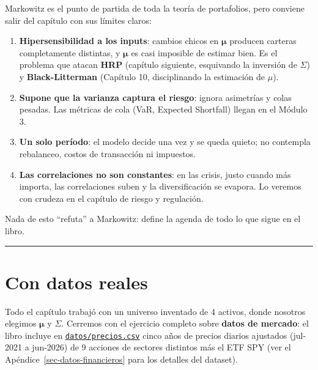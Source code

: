 \documentclass[
  spanish,
  letterpaper,
  DIV=11,
  numbers=noendperiod]{scrreprt}
\providecommand{\tightlist}{%
  \setlength{\itemsep}{0pt}\setlength{\parskip}{0pt}}
\begin{document}
Markowitz es el punto de partida de toda la teoría de portafolios, pero
conviene salir del capítulo con sus límites claros:

\begin{enumerate}
\def\labelenumi{\arabic{enumi}.}
\tightlist
\item
  \textbf{Hipersensibilidad a los inputs}: cambios chicos en
  \(\boldsymbol{\mu}\) producen carteras completamente distintas, y
  \(\boldsymbol{\mu}\) es casi imposible de estimar bien. Es el problema
  que atacan \textbf{HRP} (capítulo siguiente, esquivando la inversión
  de \(\Sigma\)) y \textbf{Black-Litterman} (Capítulo 10, disciplinando
  la estimación de \(\mu\)).
\item
  \textbf{Supone que la varianza captura el riesgo}: ignora asimetrías y
  colas pesadas. Las métricas de cola (VaR, Expected Shortfall) llegan
  en el Módulo 3.
\item
  \textbf{Un solo período}: el modelo decide una vez y se queda quieto;
  no contempla rebalanceo, costos de transacción ni impuestos.
\item
  \textbf{Las correlaciones no son constantes}: en las crisis, justo
  cuando más importa, las correlaciones suben y la diversificación se
  evapora. Lo veremos con crudeza en el capítulo de riesgo y regulación.
\end{enumerate}

Nada de esto ``refuta'' a Markowitz: define la agenda de todo lo que
sigue en el libro.

\begin{center}\rule{0.5\linewidth}{0.5pt}\end{center}

\chapter{Con datos reales}\label{con-datos-reales}

Todo el capítulo trabajó con un universo inventado de 4 activos, donde
nosotros elegimos \(\boldsymbol{\mu}\) y \(\Sigma\). Cerremos con el
ejercicio completo sobre \textbf{datos de mercado}: el libro incluye en
\href{https://github.com/diegoonna/libro_finanzas_computacionales/blob/main/datos/precios.csv}{\texttt{datos/precios.csv}}
cinco años de precios diarios ajustados (jul-2021 a jun-2026) de 9
acciones de sectores distintos más el ETF SPY (ver el
Apéndice~\ref{sec-datos-financieros} para los detalles del dataset).
\end{document}
